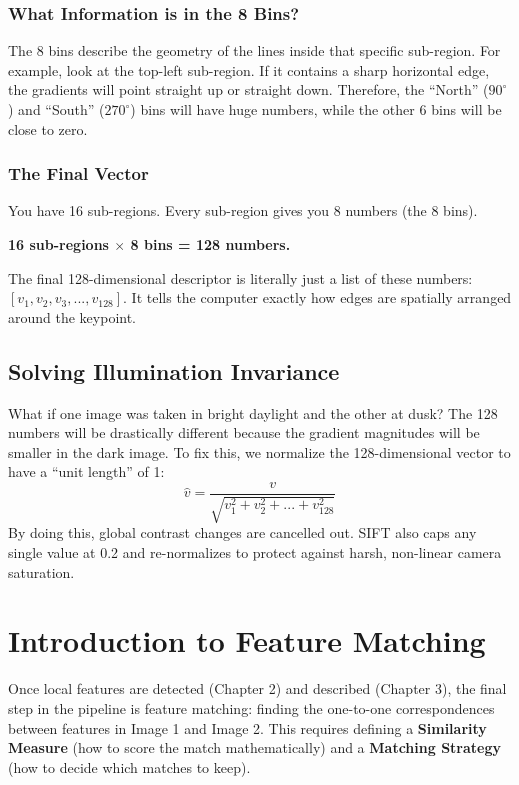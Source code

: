 \documentclass{report}
\begin{document}
\subsection{What Information is in the 8 Bins?}
The 8 bins describe the geometry of the lines inside that specific sub-region.
For example, look at the top-left sub-region. If it contains a sharp horizontal edge, the gradients will point straight up or straight down. Therefore, the ``North'' ($90^\circ$) and ``South'' ($270^\circ$) bins will have huge numbers, while the other 6 bins will be close to zero.

\subsection{The Final Vector}
You have 16 sub-regions. Every sub-region gives you 8 numbers (the 8 bins).
\begin{center}
    \textbf{16 sub-regions $\times$ 8 bins = 128 numbers.}
\end{center}
The final 128-dimensional descriptor is literally just a list of these numbers: $[v_1, v_2, v_3, ..., v_{128}]$. It tells the computer exactly how edges are spatially arranged around the keypoint.

\section{Solving Illumination Invariance}
What if one image was taken in bright daylight and the other at dusk? The 128 numbers will be drastically different because the gradient magnitudes will be smaller in the dark image.
To fix this, we normalize the 128-dimensional vector to have a ``unit length'' of 1:
\begin{equation}
    \hat{v} = \frac{v}{\sqrt{v_1^2 + v_2^2 + ... + v_{128}^2}}
\end{equation}
By doing this, global contrast changes are cancelled out. SIFT also caps any single value at 0.2 and re-normalizes to protect against harsh, non-linear camera saturation.




\chapter{Introduction to Feature Matching}
Once local features are detected (Chapter 2) and described (Chapter 3), the final step in the pipeline is feature matching:
finding the one-to-one correspondences between features in Image 1 and Image 2. This requires defining a \textbf{Similarity Measure}
(how to score the match mathematically) and a \textbf{Matching Strategy} (how to decide which matches to keep).
\end{document}
